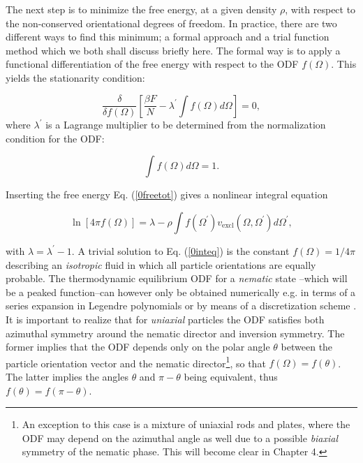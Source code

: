 {The next step is to minimize the free energy, at a given density $\rho$, with respect to the non-conserved orientational degrees of freedom. In practice, there are two different ways to find this minimum; a formal approach and a trial function method which we both shall discuss briefly here. The formal way  is to apply a functional differentiation of the free energy with respect to the ODF $f(\Omega)$. This yields the stationarity condition:

\begin{equation}
\frac{\delta}{\delta f(\Omega)} \left[\frac{\beta F}{N}-\lambda^{\prime} \int f(\Omega)d \Omega \right]=0,
\label{0statcond}
\end{equation}
where $\lambda^{\prime}$ is a Lagrange multiplier to be determined from the normalization condition for the ODF:

\begin{equation}
\int f(\Omega)d\Omega =1.
\end{equation}

Inserting the free energy Eq. (\ref{0freetot}) gives a nonlinear integral equation

\begin{equation}
\ln[4\pi f(\Omega)]=\lambda - \rho \int f(\Omega^{\prime})v_{\text{excl}}(\Omega,\Omega^{\prime})
d\Omega^{\prime}, \label{0inteq}
\end{equation}

with $\lambda=\lambda^{\prime}-1$. A trivial solution to Eq. (\ref{0inteq}) is the constant $f(\Omega)=1/4\pi$ describing an {\em isotropic} fluid in which all particle orientations are equally probable. The thermodynamic equilibrium ODF for a {\em nematic} state --which will be a peaked function--can however only be obtained numerically e.g. in terms of a series expansion in Legendre polynomials \cite{kayser,lasher,lakatos} or by means of a discretization scheme \cite{herzfeldgrid}. It is important to realize that for  {\em uniaxial} particles the ODF satisfies both azimuthal symmetry around the nematic director and inversion symmetry. The former implies that the ODF depends only on the  polar angle $\theta$ between the particle orientation vector and the nematic director\footnote{An exception to this case is a mixture of uniaxial rods and plates,
where the ODF may depend on the azimuthal angle as well
due to a possible {\em biaxial} symmetry of the nematic phase.
This will become clear in Chapter 4.}, so that $f(\Omega)=f(\theta)$. The latter  implies the angles $\theta$ and $\pi-\theta$ being equivalent, thus $f(\theta)=f(\pi-\theta)$.

}
